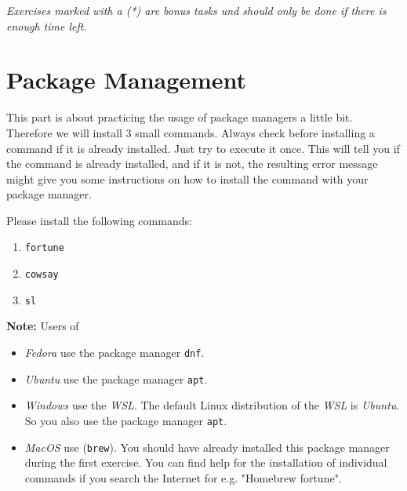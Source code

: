 \documentclass[english]{sheet}
\subtitle{Linux Exercise\textemdash Teil 2}
\begin{document}
\maketitle

\textit{Exercises marked with a (*) are bonus tasks und should only be done if there is enough time left.}

\section{Package Management}

This part is about practicing the usage of package managers a little bit. Therefore we will install 3 small commands. Always check before installing a command if it is already installed. Just try to execute it once. This will tell you if the command is already installed, and if it is not, the resulting error message might give you some instructions on how to install the command with your package manager.

\begin{exercise}
    Please install the following commands:
    \begin{enumerate}
        \item \texttt{fortune}
        \item \texttt{cowsay}
        \item \texttt{sl}
    \end{enumerate}
    \textbf{Note:} Users of
    \begin{itemize}
        \item \emph{Fedora} use the package manager \texttt{dnf}.
        \item \emph{Ubuntu} use the package manager \texttt{apt}.
        \item \emph{Windows} use the \emph{WSL}. The default Linux distribution of the \emph{WSL} is \emph{Ubuntu}. So you also use the package manager \texttt{apt}.
        \item \emph{MacOS} use  (\texttt{brew}). You should have already installed this package manager during the first exercise. You can find help for the installation of individual commands if you search the Internet for e.g. "Homebrew fortune".
    \end{itemize}
\end{exercise}
\end{document}
